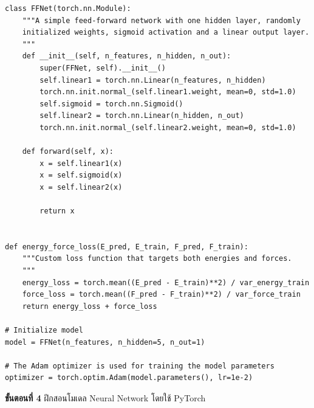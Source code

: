 \begin{lstlisting}[style=MyPython]
class FFNet(torch.nn.Module):
    """A simple feed-forward network with one hidden layer, randomly
    initialized weights, sigmoid activation and a linear output layer.
    """
    def __init__(self, n_features, n_hidden, n_out):
        super(FFNet, self).__init__()
        self.linear1 = torch.nn.Linear(n_features, n_hidden)
        torch.nn.init.normal_(self.linear1.weight, mean=0, std=1.0)
        self.sigmoid = torch.nn.Sigmoid()
        self.linear2 = torch.nn.Linear(n_hidden, n_out)
        torch.nn.init.normal_(self.linear2.weight, mean=0, std=1.0)

    def forward(self, x):
        x = self.linear1(x)
        x = self.sigmoid(x)
        x = self.linear2(x)

        return x


def energy_force_loss(E_pred, E_train, F_pred, F_train):
    """Custom loss function that targets both energies and forces.
    """
    energy_loss = torch.mean((E_pred - E_train)**2) / var_energy_train
    force_loss = torch.mean((F_pred - F_train)**2) / var_force_train
    return energy_loss + force_loss

# Initialize model
model = FFNet(n_features, n_hidden=5, n_out=1)

# The Adam optimizer is used for training the model parameters
optimizer = torch.optim.Adam(model.parameters(), lr=1e-2)
\end{lstlisting}

\vspace{1em}

\noindent \textbf{ขั้นตอนที่ 4} ฝึกสอนโมเดล Neural Network โดยใช้ PyTorch

